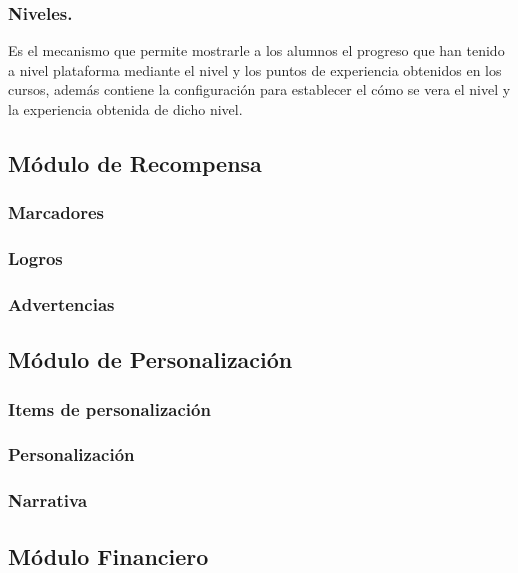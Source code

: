 \subsubsection{Niveles.}

 Es el mecanismo que permite mostrarle a los alumnos el progreso que han tenido
 a nivel plataforma mediante el nivel y los puntos de experiencia obtenidos en 
 los cursos, además contiene la configuración para establecer el cómo se vera el
 nivel y la experiencia obtenida de dicho nivel.


\subsection{Módulo de Recompensa}

\subsubsection{Marcadores}
\subsubsection{Logros}
\subsubsection{Advertencias}

\subsection{Módulo de Personalización}

\subsubsection{Items de personalización}
\subsubsection{Personalización}
\subsubsection{Narrativa}

\subsection{Módulo Financiero}

